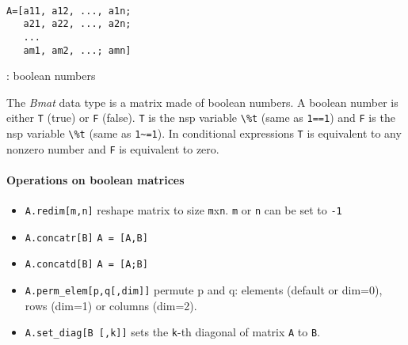 
\begin{mandesc}
   \\
\end{mandesc}
\begin{calling_sequence}
\begin{verbatim}
A=[a11, a12, ..., a1n;
   a21, a22, ..., a2n;
   ...
   am1, am2, ...; amn]
\end{verbatim}
\end{calling_sequence}
\begin{parameters}
  \begin{varlist}
    : boolean numbers
  \end{varlist}
\end{parameters}

\begin{mandescription}
The \emph{Bmat} data type is a matrix made of boolean numbers. 
A boolean number is either \verb+T+ (true) or \verb+F+ (false). 
\verb+T+ is the nsp variable \verb+\%t+ (same as \verb+1==1+)
and \verb+F+ is the nsp variable \verb+\%t+ (same as \verb+1~=1+).
In conditional expressions \verb+T+ is equivalent to any nonzero
number and \verb+F+ is equivalent to zero.
\end{mandescription}

\paragraph{Operations on boolean matrices}
\begin{itemize}
\item \verb+A.redim[m,n]+ reshape matrix to size \verb+m+x\verb+n+. \verb+m+ or \verb+n+ can be set to \verb+-1+ 
\item \verb+A.concatr[B]+ \verb+A = [A,B]+
\item \verb+A.concatd[B]+ \verb+A = [A;B]+
\item \verb+A.perm_elem[p,q[,dim]]+ permute p and q: elements
  (default or dim=0), rows (dim=1) or columns (dim=2).
\item \verb+A.set_diag[B [,k]]+ sets the \verb+k+-th diagonal of matrix \verb+A+ to \verb+B+.
\end{itemize}

